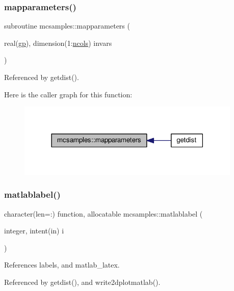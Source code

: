 \subsubsection{\texorpdfstring{mapparameters()}{mapparameters()}}
{\footnotesize\ttfamily subroutine mcsamples\+::mapparameters (\begin{DoxyParamCaption}\item[{real(\mbox{\hyperlink{namespacemcsamples_a423ddd0f2de0560617b74a17231275e0}{gp}}), dimension(1\+:\mbox{\hyperlink{namespacemcsamples_a9c7a895a8bbc32cc9ec5a4e647f93842}{ncols}})}]{invars }\end{DoxyParamCaption})}



Referenced by getdist().

Here is the caller graph for this function\+:
\nopagebreak
\begin{figure}[H]
\begin{center}
\leavevmode
\includegraphics[width=302pt]{namespacemcsamples_ac831b94ceae7c808b2656230727e6cdd_icgraph}
\end{center}
\end{figure}
\mbox{\label{namespacemcsamples_ab0762a08afdb1f7f972b966091ef0918}} 
\subsubsection{\texorpdfstring{matlablabel()}{matlablabel()}}
{\footnotesize\ttfamily character(len=\+:) function, allocatable mcsamples\+::matlablabel (\begin{DoxyParamCaption}\item[{integer, intent(in)}]{i }\end{DoxyParamCaption})}



References labels, and matlab\+\_\+latex.



Referenced by getdist(), and write2dplotmatlab().

